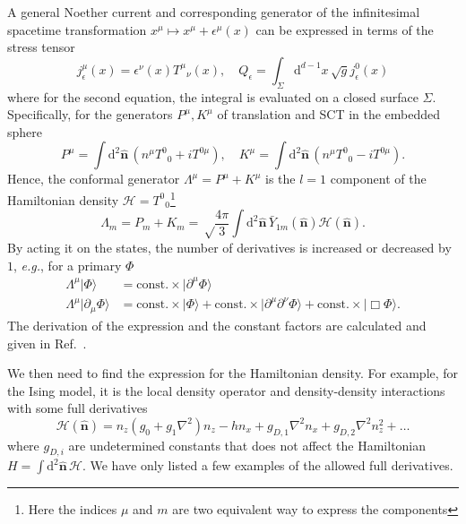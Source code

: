 \documentclass{timesjhep}
\begin{document}
A general Noether current and corresponding generator of the infinitesimal spacetime transformation $x^\mu\mapsto x^\mu+\epsilon^\mu(x)$ can be expressed in terms of the stress tensor 
\begin{equation}
    j_\epsilon^\mu(x)=\epsilon^\nu(x)T^\mu{}_\nu(x),\quad Q_\epsilon=\int_\Sigma\mathrm{d}^{d-1}x\,\sqrt{g}j_\epsilon^0(x) 
\end{equation}
where for the second equation, the integral is evaluated on a closed surface $\Sigma$. Specifically, for the generators $P^\mu,K^\mu$ of translation and SCT in the embedded sphere
\begin{equation}
    P^\mu=\int\mathrm{d}^2\hat{\mathbf{n}}\,(n^\mu T^0{}_0+iT^{0\mu}),\quad K^\mu=\int\mathrm{d}^2\hat{\mathbf{n}}\,(n^\mu T^0{}_0-iT^{0\mu}).
\end{equation} 
Hence, the conformal generator $\Lambda^\mu=P^\mu+K^\mu$ is the $l=1$ component of the Hamiltonian density $\mathcal{H}=T^0{}_0$\footnote{Here the indices $\mu$ and $m$ are two equivalent way to express the components}
\begin{equation}
    \Lambda_m=P_m+K_m=\sqrt\frac{4\pi}{3}\int\mathrm{d}^2\hat{\mathbf{n}}\,\bar{Y}_{1m}(\hat{\mathbf{n}})\mathcal{H}(\hat{\mathbf{n}}).
\end{equation}
By acting it on the states, the number of derivatives is increased or decreased by $1$, \textit{e.g.}, for a primary $\Phi$
\begin{align}
    \Lambda^\mu|\Phi\rangle&=\mathrm{const.}\times|\partial^\mu\Phi\rangle\nonumber\\     \Lambda^\mu|\partial_\mu\Phi\rangle&=\mathrm{const.}\times|\Phi\rangle+\mathrm{const.}\times|\partial^\mu\partial^\nu\Phi\rangle+\mathrm{const.}\times|\Box\Phi\rangle.
\end{align}
The derivation of the expression and the constant factors are calculated and given in Ref.~\cite{Fardelli2024,Fan2024}.

We then need to find the expression for the Hamiltonian density. For example, for the Ising model, it is the local density operator and density-density interactions with some full derivatives 
\begin{equation}
    \mathcal{H}(\hat{\mathbf{n}})=n_z\left(g_0+g_1\nabla^2\right)n_z-hn_x+g_{D,1}\nabla^2n_x+g_{D,2}\nabla^2n_z^2+\dots
\end{equation}
where $g_{D,i}$ are undetermined constants that does not affect the Hamiltonian $H=\int\mathrm{d}^2\hat{\mathbf{n}}\,\mathcal{H}$. We have only listed a few examples of the allowed full derivatives. 
\end{document}

